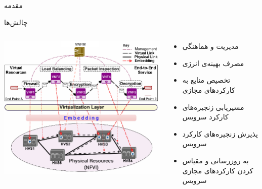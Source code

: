 \documentclass{beamer}
\makeatletter
\newcommand{\RTList}{\raggedleft\rightskip\@totalleftmargin}
\makeatother
\begin{document}
\begin{persian}
\begin{frame}{مقدمه}
\end{frame}
\begin{frame}{چالش‌ها}
    \begin{columns}
        \begin{column}{0.6\textwidth}
            \includegraphics[scale=0.35]{images/embedding.png}
        \end{column}
        \begin{column}{0.4\textwidth}
            \begin{itemize}\RTList{}
                \item مدیریت و هماهنگی
                \item مصرف بهینه‌ی انرژی
                \item تخصیص منابع به کارکردهای مجازی
                \item مسیریابی زنجیره‌های کارکرد سرویس
                \item پذیرش زنجیره‌های کارکرد سرویس
                \item به روزرسانی و مقیاس کردن کارکردهای مجازی سرویس
            \end{itemize}
        \end{column}
    \end{columns}
\end{frame}
\begin{frame}{}

\end{frame}
\end{persian}
\end{document}
